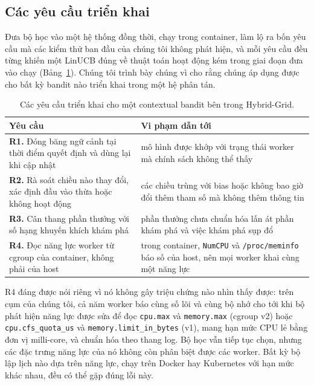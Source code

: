 \documentclass[final,5p,times,twocolumn]{elsarticle}
\begin{document}
\subsection{Các yêu cầu triển khai}
\label{sec:reqs}

Đưa bộ học vào một hệ thống đồng thời, chạy trong container, làm lộ ra bốn yêu cầu mà các kiểm thử ban đầu của chúng tôi không phát hiện, và mỗi yêu cầu đều từng khiến một LinUCB đúng về thuật toán hoạt động kém trong giai đoạn đưa vào chạy (Bảng~\ref{tab:reqs}). Chúng tôi trình bày chúng vì cho rằng chúng áp dụng được cho bất kỳ bandit nào triển khai trong một hệ phân tán.

\begin{table}[t]
\centering
\caption{Các yêu cầu triển khai cho một contextual bandit bên trong Hybrid-Grid.}
\label{tab:reqs}
\footnotesize
\begin{tabular}{p{7.4cm}p{8.6cm}}
\toprule
Yêu cầu & Vi phạm dẫn tới \\
\midrule
\textbf{R1.} Đóng băng ngữ cảnh tại thời điểm quyết định và dùng lại khi cập nhật & mô hình được khớp với trạng thái worker mà chính sách không thể thấy \\
\textbf{R2.} Rà soát chiều nào thay đổi, xác định đầu vào thừa hoặc không hoạt động & các chiều trùng với bias hoặc không bao giờ đổi thêm tham số mà không thêm thông tin \\
\textbf{R3.} Cân thang phần thưởng với số hạng khuyến khích khám phá & phần thưởng chưa chuẩn hóa lấn át phần khám phá và việc khám phá sụp đổ \\
\textbf{R4.} Đọc năng lực worker từ cgroup của container, không phải của host & trong container, \texttt{NumCPU} và \texttt{/proc/meminfo} báo số của host, nên mọi worker khai cùng một năng lực \\
\bottomrule
\end{tabular}
\end{table}

R4 đáng được nói riêng vì nó không gây triệu chứng nào nhìn thấy được: trên cụm của chúng tôi, cả năm worker báo cùng số lõi và cùng bộ nhớ cho tới khi bộ phát hiện năng lực được sửa để đọc \texttt{cpu.max} và \texttt{memory.max} (cgroup v2) hoặc \texttt{cpu.cfs\_quota\_us} và \texttt{memory.limit\_in\_bytes} (v1), mang hạn mức CPU lẻ bằng đơn vị milli-core, và chuẩn hóa theo thang log. Bộ học vẫn tiếp tục chọn, nhưng các đặc trưng năng lực của nó không còn phân biệt được các worker. Bất kỳ bộ lập lịch nào dựa trên năng lực, chạy trên Docker hay Kubernetes với hạn mức khác nhau, đều có thể gặp đúng lỗi này.
\end{document}
